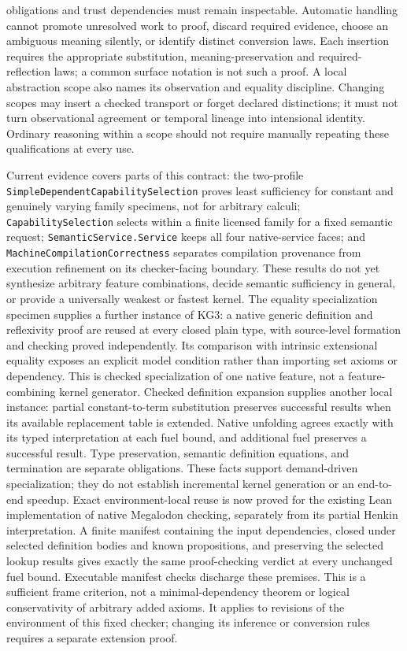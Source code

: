 \documentclass[11pt]{article}
\theoremstyle{definition}
\theoremstyle{remark}
\begin{document}
\begin{description}[leftmargin=1.2cm,style=nextline]
  obligations and trust dependencies must remain inspectable. Automatic
  handling cannot promote unresolved work to proof, discard required evidence,
  choose an ambiguous meaning silently, or identify distinct conversion laws.
  Each insertion requires the appropriate substitution, meaning-preservation
  and required-reflection laws; a common surface notation is not such a proof.
  A local abstraction scope also names its observation and equality discipline.
  Changing scopes may insert a checked transport or forget declared distinctions;
  it must not turn observational agreement or temporal lineage into intensional
  identity. Ordinary reasoning within a scope should not require manually
  repeating these qualifications at every use.
\end{description}

Current evidence covers parts of this contract: the two-profile
\nolinkurl{SimpleDependentCapabilitySelection} proves least sufficiency for
constant and genuinely varying family specimens, not for arbitrary calculi;
\nolinkurl{CapabilitySelection} selects within a finite licensed family for
a fixed semantic request; \nolinkurl{SemanticService.Service} keeps all four native-service
faces; and \nolinkurl{MachineCompilationCorrectness} separates compilation provenance
from execution refinement on its checker-facing boundary. These results do
not yet synthesize arbitrary feature combinations, decide semantic sufficiency
in general, or provide a universally weakest or fastest kernel.
The equality specialization specimen supplies a further instance of KG3:
a native generic definition and reflexivity proof are reused at every closed
plain type, with source-level formation and checking proved independently.
Its comparison with intrinsic extensional equality exposes an explicit model
condition rather than importing set axioms or dependency. This is checked
specialization of one native feature, not a feature-combining kernel generator.
Checked definition expansion supplies another local instance: partial
constant-to-term substitution preserves successful results when its available
replacement table is extended. Native unfolding agrees exactly with its typed
interpretation at each fuel bound, and additional fuel preserves a successful
result. Type preservation, semantic definition equations, and termination are
separate obligations. These facts support demand-driven specialization; they
do not establish incremental kernel generation or an end-to-end speedup.
Exact environment-local reuse is now proved for the existing Lean implementation
of native Megalodon checking, separately from its partial Henkin interpretation. A finite manifest
containing the input dependencies, closed under selected definition bodies and
known propositions, and preserving the selected lookup results gives exactly
the same proof-checking verdict at every unchanged fuel bound. Executable
manifest checks discharge these premises. This is a sufficient frame criterion,
not a minimal-dependency theorem or logical conservativity of arbitrary added
axioms. It applies to revisions of the environment of this fixed checker;
changing its inference or conversion rules requires a separate extension proof.
\end{document}
